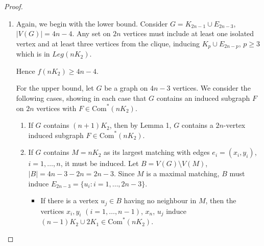 \documentclass[a4paper,12pt]{article}
\begin{document}
\begin{proof}
\begin{enumerate}
{Since $|B|=4>3=|M|$, some two vertices say $u_1,u_2\in B$ have neigbours in the same matching edge say $x_1y_1$, and nonadjacent to the other two edges of $M$.
Then $\{u_1,u_2,x_2,x_3,y_2,y_3\}$ induces	  $2K_1\cup 2K_2 \in \text{Com}^*(3K_2)$\,.




Therefore $f(3K_2)<10$, implying $f(3K_2)=9$.}
\bigskip
\item{  Again, we begin with the lower bound.  Consider $G = K_{2n-1} \cup E_{2n-3}$, $|V(G)| = 4n - 4$. Any set on $2n$ vertices must include at least one isolated vertex and at least three vertices from the clique, inducing $K_p \cup E_{2n-p}$, $p \geq 3$ which is in $Leg(nK_2)$.

Hence $f(nK_2) \ge 4n - 4$.

For the upper bound, let $G$ be a graph on $4n-3$ vertices. We consider the following cases, showing in each case that  $G$ contains an induced subgraph $F$ on $2n$ vertices with $F \in \text{Com}^*(nK_2)$.

\begin{enumerate} 
\item{If $G$ contains $(n+1)K_2$, then by Lemma 1, $G$ contains a $2n$-vertex induced subgraph $F \in \text{Com}^*(nK_2)$. }
\item{If $G$ contains $M = nK_2$ as its largest matching with edges $e_i = (x_i, y_i)$, $i = 1, \dots, n$, it must be induced.  Let $B = V(G) \setminus V(M)$, $|B| = 4n-3 - 2n = 2n-3$.  Since $M$ is a maximal matching, $B$ must induce $E_{2n-3}=\{u_i : i=1, \ldots, 2n-3\}$.

\begin{itemize}
\item{If there is a vertex $u_j\in B$ having no neighbour in $M$, then the vertices $ x_i, y_i$ $(i = 1, \dots, n-1)$, $x_n$, $u_j$  induce $(n-1)K_2 \cup 2K_1 \in \text{Com}^*(nK_2)$.}


\end{itemize}}
\end{enumerate}}
\end{enumerate}
\end{proof}
\end{document}
